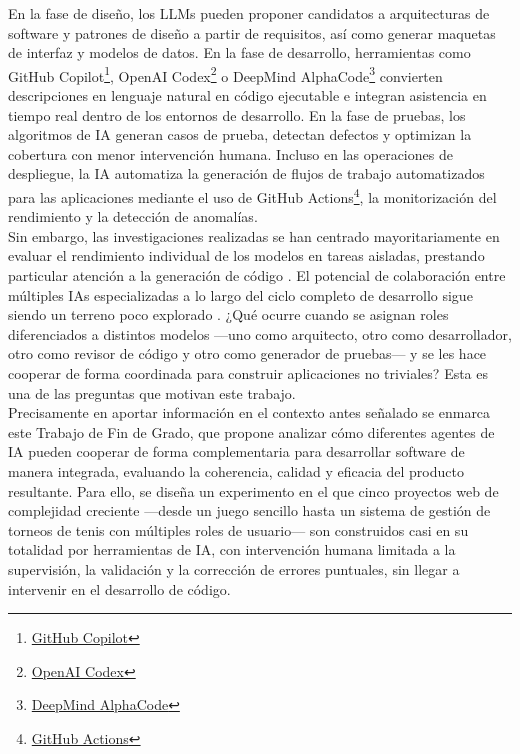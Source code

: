 En la fase de diseño, los \ac{LLMs} pueden proponer candidatos a arquitecturas de software y patrones de diseño a partir de requisitos, así como generar maquetas de interfaz y modelos de datos. En la fase de desarrollo, herramientas como GitHub Copilot\footnote{\href{https://github.com/features/copilot}{GitHub Copilot}}, OpenAI Codex\footnote{\href{https://openai.com/codex}{OpenAI Codex}} o DeepMind AlphaCode\footnote{\href{https://deepmind.google}{DeepMind AlphaCode}} convierten descripciones en lenguaje natural en código ejecutable e integran asistencia en tiempo real dentro de los entornos de desarrollo. En la fase de pruebas, los algoritmos de \ac{IA} generan casos de prueba, detectan defectos y optimizan la cobertura con menor intervención humana. Incluso en las operaciones de despliegue, la \ac{IA} automatiza la generación de flujos de trabajo automatizados para las aplicaciones mediante el uso de GitHub Actions\footnote{\href{https://github.com/features/actions}{GitHub Actions}}, la monitorización del rendimiento y la detección de anomalías.\\

Sin embargo, las investigaciones realizadas se han centrado mayoritariamente en evaluar el rendimiento individual de los modelos en tareas aisladas, prestando particular atención a la generación de código \cite{Wang:2023:LLMReview, Tosi:2024:CodeQuality}. El potencial de colaboración entre múltiples \ac{IAs} especializadas a lo largo del ciclo completo de desarrollo sigue siendo un terreno poco explorado \cite{Turunen:2023:FromIdeas}. ¿Qué ocurre cuando se asignan roles diferenciados a distintos modelos ---uno como arquitecto, otro como desarrollador, otro como revisor de código y otro como generador de pruebas--- y se les hace cooperar de forma coordinada para construir aplicaciones no triviales? Esta es una de las preguntas que motivan este trabajo.\\

Precisamente en aportar información en el contexto antes señalado se enmarca este Trabajo de Fin de Grado, que propone analizar cómo diferentes agentes de \ac{IA} pueden cooperar de forma complementaria para desarrollar software de manera integrada, evaluando la coherencia, calidad y eficacia del producto resultante. Para ello, se diseña un experimento en el que cinco proyectos web de complejidad creciente ---desde un juego sencillo hasta un sistema de gestión de torneos de tenis con múltiples roles de usuario--- son construidos casi en su totalidad por herramientas de \ac{IA}, con intervención humana limitada a la supervisión, la validación y la corrección de errores puntuales, sin llegar a intervenir en el desarrollo de código.

